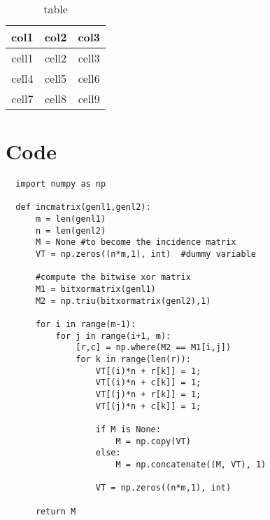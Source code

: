 \begin{table}[h!]
  \centering
  \begin{tabular}{||c c c ||}
    \hline
    col1  & col2  & col3  \\
    \hline\hline
    cell1 & cell2 & cell3 \\\hline
    cell4 & cell5 & cell6 \\\hline
    cell7 & cell8 & cell9 \\\hline
  \end{tabular}
  \caption{table}
  \label{tab:tabular}
\end{table}

\section{Code}

\begin{verbatim}
  import numpy as np

  def incmatrix(genl1,genl2):
      m = len(genl1)
      n = len(genl2)
      M = None #to become the incidence matrix
      VT = np.zeros((n*m,1), int)  #dummy variable

      #compute the bitwise xor matrix
      M1 = bitxormatrix(genl1)
      M2 = np.triu(bitxormatrix(genl2),1)

      for i in range(m-1):
          for j in range(i+1, m):
              [r,c] = np.where(M2 == M1[i,j])
              for k in range(len(r)):
                  VT[(i)*n + r[k]] = 1;
                  VT[(i)*n + c[k]] = 1;
                  VT[(j)*n + r[k]] = 1;
                  VT[(j)*n + c[k]] = 1;

                  if M is None:
                      M = np.copy(VT)
                  else:
                      M = np.concatenate((M, VT), 1)

                  VT = np.zeros((n*m,1), int)

      return M
\end{verbatim}

